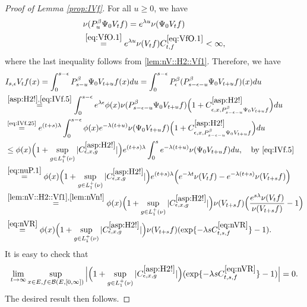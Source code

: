 \documentclass[12pt,a4paper]{amsart}
\numberwithin{equation}{section}
\theoremstyle{plain}
\theoremstyle{definition}
\theoremstyle{remark}
\begin{document}
\begin{proof}[Proof of Lemma \ref{prop:IVf}]
	For all $u\geq 0$, we have
\begin{align} \label{eq:IVf.25}
	&\nu(P_u^\beta \Psi_0 V_t f) = e^{\lambda u}\nu(\Psi_0 V_t f)
	\\&\overset{\eqref{eq:VfO.1}}=e^{\lambda u}\nu(V_tf) C^{\eqref{eq:VfO.1}}_{t,f}
	< \infty, \label{eq:IVf.5}
\end{align}
	where the last inequality follows from \eqref{lem:nV::H2::Vf1}.
	Therefore, we have
\begin{align}
 	& I_{s,\epsilon} V_t f(x)
 	= \int_0^{s- \epsilon} P_{s-u}^\beta \Psi_0 V_{t+u} f (x) du
 	= \int_0^{s- \epsilon} P_\epsilon^\beta (P_{s - \epsilon - u}^\beta \Psi_0 V_{t+u} f )(x) du
 	\\&\overset{\eqref{asp:H2!},\eqref{eq:IVf.5}}= \int_0^{s - \epsilon} e^{\lambda \epsilon} \phi(x) \nu(P_{s - \epsilon - u}^{\beta} \Psi_0 V_{t+u} f)  \Big(1+C^{\eqref{asp:H2!}}_{\epsilon ,x , P_{s - \epsilon - u}^{\beta} \Psi_0 V_{t+u} f}\Big) du 
	\\&\overset{\text{\eqref{eq:IVf.25}}}= e^{(t+s)\lambda} \int_0^{s - \epsilon} \phi(x) e^{-\lambda (t+u)}\nu(\Psi_0 V_{t+u} f)  \Big(1+C^{\eqref{asp:H2!}}_{\epsilon ,x , P_{s - \epsilon - u}^{\beta} \Psi_0 V_{t+u} f}\Big) du
	\\&\leq \phi(x) \Big(1+\sup_{g\in L_1^+(\nu)}|C^{\eqref{asp:H2!}}_{\epsilon ,x , g}|\Big) e^{(t+s)\lambda} \int_0^{s} e^{-\lambda (t+u)} \nu(\Psi_0 V_{t+u}f)du,\quad\text{by \eqref{eq:IVf.5}}
 	\\&\overset{\eqref{eq:nuP.1}}= \phi(x) \Big(1+\sup_{g\in L_1^+(\nu)}|C^{\eqref{asp:H2!}}_{\epsilon ,x , g}|\Big)  e^{(t+s)\lambda} \Big(e^{-\lambda t}\nu(V_tf)- e^{-\lambda(t+s)}\nu(V_{t+s}f)\Big)
 	\\&\overset{\eqref{lem:nV::H2::Vf1},\eqref{lem:nVn!}}= \phi(x) \Big(1+\sup_{g\in L_1^+(\nu)}|C^{\eqref{asp:H2!}}_{\epsilon ,x , g}|\Big) \nu(V_{t+s}f) \Big( \frac{e^{s \lambda }\nu(V_tf)}{\nu(V_{t+s}f)} - 1\Big)
 	\\&\overset{\eqref{eq:nVR}}= \phi(x) \Big(1+\sup_{g\in L_1^+(\nu)}|C^{\eqref{asp:H2!}}_{\epsilon ,x , g}|\Big) \nu(V_{t+s}f) ( \exp\{- \lambda s C^{\eqref{eq:nVR}}_{t,s,f}\} - 1).
\end{align}
	It is easy to check that
\begin{equation}
	\lim_{t\to \infty}\sup_{x\in E, f\in \mathcal B(E,[0,\infty])}
	\Big|\Big(1+\sup_{g\in L_1^+(\nu)}|C^{\eqref{asp:H2!}}_{\epsilon ,x , g}|\Big)( \exp\{- \lambda s C^{\eqref{eq:nVR}}_{t,s,f}\} - 1) \Big| = 0.
\end{equation}
	The desired result then follows.
\end{proof}
\end{document}
